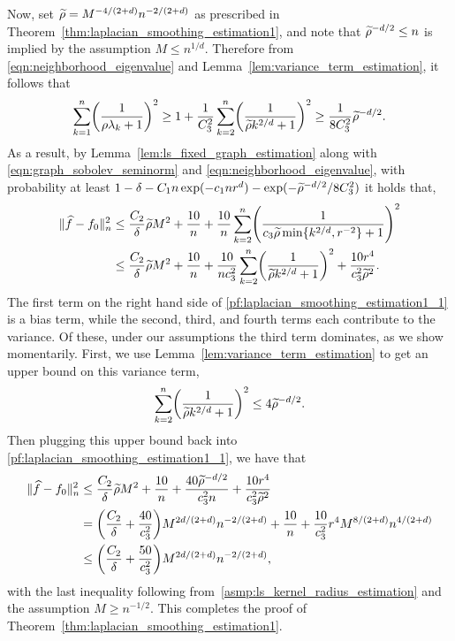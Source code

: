 Now, set $\widetilde{\rho} = M^{-4/(2 + d)}n^{-2/(2 + d)}$ as prescribed in Theorem~\ref{thm:laplacian_smoothing_estimation1}, and note that $\widetilde{\rho}^{-d/2} \leq n$ is implied by the assumption $M \leq n^{1/d}$. Therefore  from \eqref{eqn:neighborhood_eigenvalue} and Lemma~\ref{lem:variance_term_estimation}, it follows that
\begin{equation*}
\sum_{k = 1}^{n}\biggl(\frac{1}{\rho \lambda_k + 1}\biggr)^{2} \geq 1 + \frac{1}{C_3^2}\sum_{k = 2}^{n}\biggl(\frac{1}{\widetilde{\rho} k^{2/d} + 1}\biggr)^{2} \geq \frac{1}{8C_3^2} \widetilde{\rho}^{-d/2}.
\end{equation*}
As a result, by Lemma~\ref{lem:ls_fixed_graph_estimation} along with \eqref{eqn:graph_sobolev_seminorm} and \eqref{eqn:neighborhood_eigenvalue}, with probability at least $1 - \delta - C_1n\exp(-c_1nr^d) - \exp(-\widetilde{\rho}^{-d/2}/8C_3^2)$ it holds that,
\begin{align}
\|\widehat{f} - f_0\|_n^2 & \leq \frac{C_2}{\delta} \widetilde{\rho} M^2 + \frac{10}{n} + \frac{10}{n}\sum_{k = 2}^{n} \Biggl(\frac{1}{c_3 \widetilde{\rho}\min\{k^{2/d},r^{-2}\} + 1}\Biggr)^2 \nonumber \\
& \leq \frac{C_2}{\delta} \widetilde{\rho} M^2 + \frac{10}{n} + \frac{10}{nc_3^2}\sum_{k = 2}^{n} \biggl(\frac{1}{\widetilde{\rho}k^{2/d} + 1}\biggr)^2 + \frac{10r^4}{c_3^2 \widetilde{\rho}^2}. \label{pf:laplacian_smoothing_estimation1_1}
\end{align}
The first term on the right hand side of \eqref{pf:laplacian_smoothing_estimation1_1} is a bias term, while the second, third, and fourth terms each contribute to the variance. Of these, under our assumptions the third term dominates, as we show momentarily. First, we use Lemma~\ref{lem:variance_term_estimation} to get an upper bound on this variance term,
\begin{equation*}
\sum_{k = 2}^{n}\biggl(\frac{1}{\widetilde{\rho}k^{2/d} + 1}\biggr)^2 \leq 4\widetilde{\rho}^{-d/2}.
\end{equation*}
Then plugging this upper bound back into \eqref{pf:laplacian_smoothing_estimation1_1}, we have that
\begin{align*}
\|\widehat{f} - f_0\|_n^2 & \leq\frac{C_2}{\delta} \widetilde{\rho} M^2 + \frac{10}{n} + \frac{40\widetilde{\rho}^{-d/2}}{c_3^{2}n}  + \frac{10r^4}{c_3^2 \widetilde{\rho}^2} \\
& = \biggl(\frac{C_2}{\delta} + \frac{40}{c_3^{2}}\biggr)M^{2d/(2+d)} n^{-2/(2 + d)} + \frac{10}{n} + \frac{10}{c_3^2}r^4M^{8/(2 + d)}n^{4/(2 + d)} \\
& \leq \biggl(\frac{C_2}{\delta} + \frac{50}{c_3^{2}}\biggr)M^{2d/(2+d)} n^{-2/(2 + d)},
\end{align*}
with the last inequality following from~\ref{asmp:ls_kernel_radius_estimation} and the assumption $M \geq n^{-1/2}$. This completes the proof of Theorem~\ref{thm:laplacian_smoothing_estimation1}.

